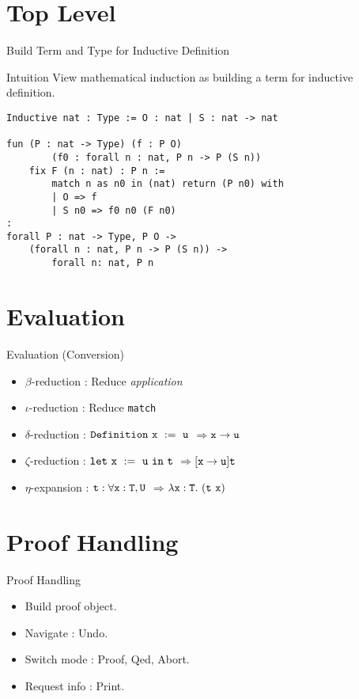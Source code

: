\documentclass[UTF-8]{beamer}
\begin{document}
\section{Top Level}
\begin{frame}[fragile]{Build Term and Type for Inductive Definition}
\begin{exampleblock}{Intuition}
    View mathematical induction as building a term for inductive definition.
\end{exampleblock}

\begin{verbatim}
Inductive nat : Type := O : nat | S : nat -> nat

fun (P : nat -> Type) (f : P O) 
        (f0 : forall n : nat, P n -> P (S n)) 
    fix F (n : nat) : P n :=
        match n as n0 in (nat) return (P n0) with
        | O => f
        | S n0 => f0 n0 (F n0)
:
forall P : nat -> Type, P O -> 
    (forall n : nat, P n -> P (S n)) -> 
        forall n: nat, P n
\end{verbatim}
\end{frame}

\section{Evaluation}
\begin{frame}{Evaluation (Conversion)}
\begin{itemize}
    \item $\beta$-reduction : Reduce \textit{application}
    \item $\iota$-reduction : Reduce {\tt match}
    \item $\delta$-reduction : $\tt Definition\ x\ :=\ u$ \quad $\Rightarrow$\quad $\tt x\to u$
    \item $\zeta$-reduction : $\tt let\ x\ :=\ u\ in\ t$ \quad $\Rightarrow$\quad $\tt [x\to u]t$
    \item $\eta$-expansion : $\tt t:\forall x:T,U$ \quad $\Rightarrow$\quad $\tt \lambda x:T.\ (t\ x)$
\end{itemize}
\end{frame}

\section{Proof Handling}
\begin{frame}{Proof Handling}
\begin{itemize}
\item Build proof object.
\item Navigate : Undo.
\item Switch mode : Proof, Qed, Abort.
\item Request info : Print.
\end{itemize}
\end{frame}
\end{document}
